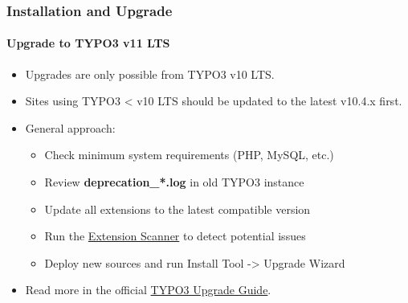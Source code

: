 %

\begin{frame}[fragile]
	\frametitle{Installation and Upgrade}
	\framesubtitle{Upgrade to TYPO3 v11 LTS}

	\begin{itemize}
		\item Upgrades are only possible from TYPO3 v10 LTS.
		\item Sites using TYPO3 < v10 LTS should be updated to the latest v10.4.x first.
	\end{itemize}

	\begin{itemize}
		\item General approach:
			\begin{itemize}
				\item Check minimum system requirements \small(PHP, MySQL, etc.)
				\item Review \textbf{deprecation\_*.log} in old TYPO3 instance
				\item Update all extensions to the latest compatible version
				\item Run the \href{https://docs.typo3.org/m/typo3/reference-coreapi/11.5/en-us/ApiOverview/ExtensionScanner/Index.html}{Extension Scanner} to detect potential issues
				\item Deploy new sources and run Install Tool -> Upgrade Wizard
			\end{itemize}
		\item Read more in the official
			\href{https://docs.typo3.org/m/typo3/guide-installation/11.5/en-us/Index.html}{TYPO3 Upgrade Guide}.

	\end{itemize}

\end{frame}

